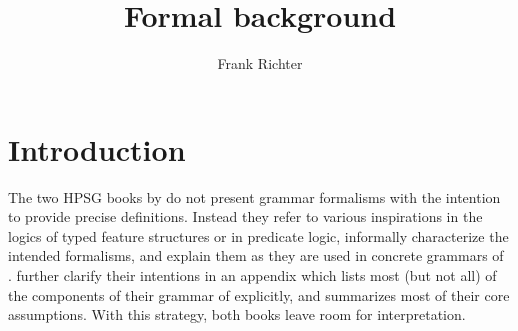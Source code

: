 \documentclass[output=paper
 	        ,biblatex
                ,babelshorthands
                ,newtxmath
                ,draftmode
                ,colorlinks, citecolor=brown
]{langscibook}
\author{%
 Frank Richter\affiliation{Goethe Universität Frankfurt}%
}
\title{Formal background}
\begin{document}
\maketitle
\label{chap-formal-background}

\section{Introduction}
\label{sec-introduction}

The two HPSG books by \citet{PollardSag1987,PollardSag1994} do not present grammar formalisms
with the intention to provide precise definitions.
Instead they refer to various inspirations in the
logics of typed feature structures or in predicate logic, informally
characterize the intended formalisms, and explain them as they are
used in concrete grammars of . \citet{PollardSag1994} further clarify
their intentions in an appendix which lists most (but not all) of the components
of their grammar of  explicitly, and summarizes most of their core
assumptions. With this strategy, both books leave room for
interpretation.
\end{document}
